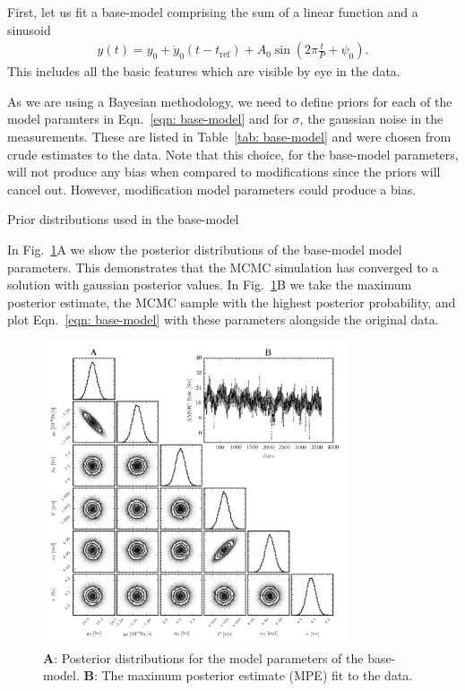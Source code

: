\documentclass{article}
\newcommand{\tref}{t_{\textrm{ref}}}
\begin{document}
First, let us fit a base-model comprising the sum of a linear function and a
sinusoid
\begin{align}
y(t) = y_0 + \dot{y}_0(t - \tref) + A_0 \sin\left(2\pi \frac{t}{P} + \psi_0\right).
\label{eqn: base-model}
\end{align}
This includes all the basic features which are visible by eye in the data.

As we are using a Bayesian methodology, we need to define priors for each of
the model paramters in Eqn.~\eqref{eqn: base-model} and for $\sigma$, the
gaussian noise in the measurements. These are listed in Table~\ref{tab: base-model}
and were chosen from crude estimates to the data. Note that this choice, for the
base-model parameters, will not produce any bias when compared to modifications
since the priors will cancel out. However, modification model parameters could
produce a bias.
\begin{table}[htb]
\centering
\caption{Prior distributions used in the base-model}
\label{tab: base-model}

\end{table}

In Fig.~\ref{fig: base-model}A we show the posterior distributions of the
base-model model parameters. This demonstrates that the MCMC simulation has
converged to a solution with gaussian posterior values. In Fig.~\ref{fig: base-model}B
we take the maximum posterior estimate, the MCMC sample with the highest posterior
probability, and plot Eqn.~\eqref{eqn: base-model} with these parameters alongside
the original data.
\begin{figure}[htb]
\centering
\includegraphics[width=0.8\textwidth]{img/BasicSinusoid_PosteriorWithFit}
\caption{\textbf{A}: Posterior distributions for the model parameters of the
base-model. \textbf{B}: The maximum posterior estimate (MPE) fit to the data.}
\label{fig: base-model}
\end{figure}
\end{document}
